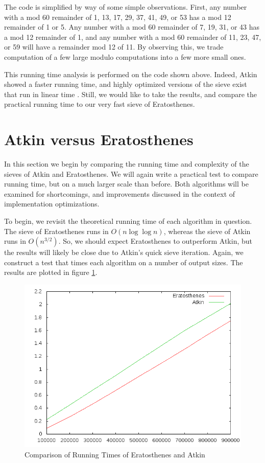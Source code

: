 \documentclass{amsart}
\theoremstyle{definition}
\theoremstyle{case}
\begin{document}
	The code is simplified by way of some simple observations. First, any number with a mod 60 remainder of 1, 13, 17, 29, 37, 41, 49, or 53 has a mod 12 remainder of 1 or 5. Any number with a mod 60 remainder of 7, 19, 31, or 43 has a mod 12 remainder of 1, and any number with a mod 60 remainder of 11, 23, 47, or 59 will have a remainder mod 12 of 11. By observing this, we trade computation of a few large modulo computations into a few more small ones.
	

	This running time analysis is performed on the code shown above. Indeed, Atkin showed a faster running time, and highly optimized versions of the sieve exist that run in linear time \cite[p.~1027]{MR2031423}. Still, we would like to take the results, and compare the practical running time to our very fast sieve of Eratosthenes.
	
	
	\section{Atkin versus Eratosthenes}
	
	In this section we begin by comparing the running time and complexity of the sieves of Atkin and Eratosthenes. We will again write a practical test to compare running time, but on a much larger scale than before. Both algorithms will be examined for shortcomings, and improvements discussed in the context of implementation optimizations.
	
	To begin, we revisit the theoretical running time of each algorithm in question. The sieve of Eratosthenes runs in $O(n \log \log n)$, whereas the sieve of Atkin runs in $O(n^{3/2})$. So, we should expect Eratosthenes to outperform Atkin, but the results will likely be close due to Atkin's quick sieve iteration. Again, we construct a test that times each algorithm on a number of output sizes. The results are plotted in figure \ref{runtimeeratkin}.
	
	\begin{figure}\caption{Comparison of Running Times of Eratosthenes and Atkin}
		\label{runtimeeratkin}
		\includegraphics[scale=0.5]{eratkin1.png}
	\end{figure}
\end{document}
